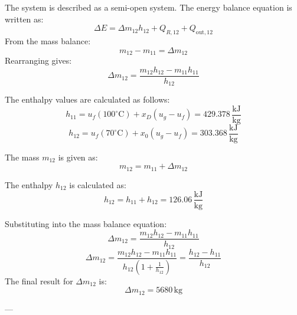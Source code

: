 The system is described as a semi-open system. The energy balance equation is written as:  
\[
\Delta E = \Delta m_{12} h_{12} + Q_{R,12} + Q_{\text{out},12}
\]  
From the mass balance:  
\[
m_{12} - m_{11} = \Delta m_{12}
\]  
Rearranging gives:  
\[
\Delta m_{12} = \frac{m_{12} h_{12} - m_{11} h_{11}}{h_{12}}
\]  

The enthalpy values are calculated as follows:  
\[
h_{11} = u_f(100^\circ\text{C}) + x_D (u_g - u_f) = 429.378 \, \frac{\text{kJ}}{\text{kg}}
\]  
\[
h_{12} = u_f(70^\circ\text{C}) + x_0 (u_g - u_f) = 303.368 \, \frac{\text{kJ}}{\text{kg}}
\]  

The mass \( m_{12} \) is given as:  
\[
m_{12} = m_{11} + \Delta m_{12}
\]  

The enthalpy \( h_{12} \) is calculated as:  
\[
h_{12} = h_{11} + h_{12} = 126.06 \, \frac{\text{kJ}}{\text{kg}}
\]  

Substituting into the mass balance equation:  
\[
\Delta m_{12} = \frac{m_{12} h_{12} - m_{11} h_{11}}{h_{12}}
\]  
\[
\Delta m_{12} = \frac{m_{12} h_{12} - m_{11} h_{11}}{h_{12} \left(1 + \frac{1}{h_{12}}\right)} = \frac{h_{12} - h_{11}}{h_{12}}
\]  
The final result for \( \Delta m_{12} \) is:  
\[
\Delta m_{12} = 5680 \, \text{kg}
\]  

---